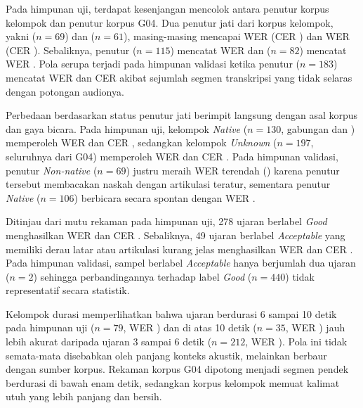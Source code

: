 Pada himpunan uji, terdapat kesenjangan mencolok antara penutur korpus kelompok dan penutur korpus G04. Dua penutur jati dari korpus kelompok, yakni  (\(n = 69\)) dan  (\(n = 61\)), masing-masing mencapai WER  (CER ) dan WER  (CER ). Sebaliknya, penutur  (\(n = 115\)) mencatat WER  dan  (\(n = 82\)) mencatat WER . Pola serupa terjadi pada himpunan validasi ketika penutur  (\(n = 183\)) mencatat WER  dan CER  akibat sejumlah segmen transkripsi yang tidak selaras dengan potongan audionya.

Perbedaan berdasarkan status penutur jati berimpit langsung dengan asal korpus dan gaya bicara. Pada himpunan uji, kelompok \textit{Native} (\(n = 130\), gabungan  dan ) memperoleh WER  dan CER , sedangkan kelompok \textit{Unknown} (\(n = 197\), seluruhnya dari G04) memperoleh WER  dan CER . Pada himpunan validasi, penutur \textit{Non-native}  (\(n = 69\)) justru meraih WER terendah () karena penutur tersebut membacakan naskah dengan artikulasi teratur, sementara penutur \textit{Native}  (\(n = 106\)) berbicara secara spontan dengan WER .

Ditinjau dari mutu rekaman pada himpunan uji, 278 ujaran berlabel \textit{Good} menghasilkan WER  dan CER . Sebaliknya, 49 ujaran berlabel \textit{Acceptable} yang memiliki derau latar atau artikulasi kurang jelas menghasilkan WER  dan CER . Pada himpunan validasi, sampel berlabel \textit{Acceptable} hanya berjumlah dua ujaran (\(n = 2\)) sehingga perbandingannya terhadap label \textit{Good} (\(n = 440\)) tidak representatif secara statistik.

Kelompok durasi memperlihatkan bahwa ujaran berdurasi 6 sampai 10 detik pada himpunan uji (\(n = 79\), WER ) dan di atas 10 detik (\(n = 35\), WER ) jauh lebih akurat daripada ujaran 3 sampai 6 detik (\(n = 212\), WER ). Pola ini tidak semata-mata disebabkan oleh panjang konteks akustik, melainkan berbaur dengan sumber korpus. Rekaman korpus G04 dipotong menjadi segmen pendek berdurasi di bawah enam detik, sedangkan korpus kelompok memuat kalimat utuh yang lebih panjang dan bersih.
